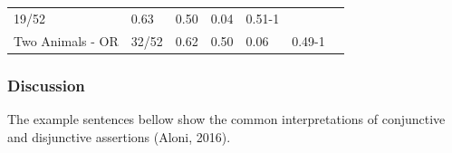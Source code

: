 \documentclass[man]{apa6}
\theoremstyle{definition}
\theoremstyle{definition}
\theoremstyle{definition}
\theoremstyle{remark}
\begin{document}
\begin{longtable}[]{@{}lllllll@{}}
\begin{minipage}[t]{0.19\columnwidth}
19/52\strut
\end{minipage} & \begin{minipage}[t]{0.08\columnwidth}\raggedright\strut
0.63\strut
\end{minipage} & \begin{minipage}[t]{0.08\columnwidth}\raggedright\strut
0.50\strut
\end{minipage} & \begin{minipage}[t]{0.08\columnwidth}\raggedright\strut
0.04\strut
\end{minipage} & \begin{minipage}[t]{0.08\columnwidth}\raggedright\strut
0.51-1\strut
\end{minipage} & \begin{minipage}[t]{0.08\columnwidth}\raggedright\strut
\strut
\end{minipage}\tabularnewline
\begin{minipage}[t]{0.23\columnwidth}\raggedright\strut
Two Animals - OR\strut
\end{minipage} & \begin{minipage}[t]{0.19\columnwidth}\raggedright\strut
32/52\strut
\end{minipage} & \begin{minipage}[t]{0.08\columnwidth}\raggedright\strut
0.62\strut
\end{minipage} & \begin{minipage}[t]{0.08\columnwidth}\raggedright\strut
0.50\strut
\end{minipage} & \begin{minipage}[t]{0.08\columnwidth}\raggedright\strut
0.06\strut
\end{minipage} & \begin{minipage}[t]{0.08\columnwidth}\raggedright\strut
0.49-1\strut
\end{minipage} & \begin{minipage}[t]{0.08\columnwidth}\raggedright\strut
\strut
\end{minipage}\tabularnewline
\bottomrule
\end{longtable}

\subsubsection{Discussion}\label{discussion}

The example sentences bellow show the common interpretations of
conjunctive and disjunctive assertions (Aloni, 2016).
\end{document}
